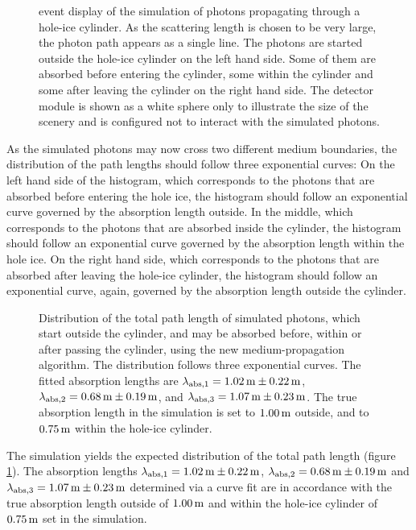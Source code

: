 \begin{figure}[htbp]
  \caption{\steamshovel event display of the simulation of photons propagating through a hole-ice cylinder. As the scattering length is chosen to be very large, the photon path appears as a single line.  The photons are started outside the hole-ice cylinder on the left hand side. Some of them are absorbed before entering the cylinder, some within the cylinder and some after leaving the cylinder on the right hand side. The detector module is shown as a white sphere only to illustrate the size of the scenery and is configured not to interact with the simulated photons.}
\end{figure}

As the simulated photons may now cross two different medium boundaries,
the distribution of the path lengths should follow three exponential
curves: On the left hand side of the histogram, which corresponds to the
photons that are absorbed before entering the hole ice, the histogram
should follow an exponential curve governed by the absorption length
outside. In the middle, which corresponds to the photons that are
absorbed inside the cylinder, the histogram should follow an exponential
curve governed by the absorption length within the hole ice. On the
right hand side, which corresponds to the photons that are absorbed
after leaving the hole-ice cylinder, the histogram should follow an
exponential curve, again, governed by the absorption length outside the
cylinder.

\begin{figure}[htbp]
  \caption{Distribution of the total path length of simulated photons, which start outside the cylinder, and may be absorbed before, within or after passing the cylinder, using the new medium-propagation algorithm. The distribution follows three exponential curves. The fitted absorption lengths are $\lambda_\text{abs,1} = 1.02\text{\,m} \pm 0.22\text{\,m}$, $\lambda_\text{abs,2} = 0.68\text{\,m} \pm 0.19\text{\,m}$, and $\lambda_\text{abs,3} = 1.07\text{\,m} \pm 0.23\text{\,m}$. The true absorption length in the simulation is set to $1.00\text{\,m}$ outside, and to $0.75\text{\,m}$ within the hole-ice cylinder.}
  \label{fig:io9eiDee}
\end{figure}

The simulation yields the expected distribution of the total path length
(figure \ref{fig:io9eiDee}). The absorption lengths
\(\lambda_\text{abs,1} = 1.02\text{\,m} \pm 0.22\text{\,m}\),
\(\lambda_\text{abs,2} = 0.68\text{\,m} \pm 0.19\text{\,m}\) and
\(\lambda_\text{abs,3} = 1.07\text{\,m} \pm 0.23\text{\,m}\) determined via a curve fit
are in accordance with the true absorption length outside of \(1.00\text{\,m}\)
and within the hole-ice cylinder of \(0.75\text{\,m}\) set in the simulation.

